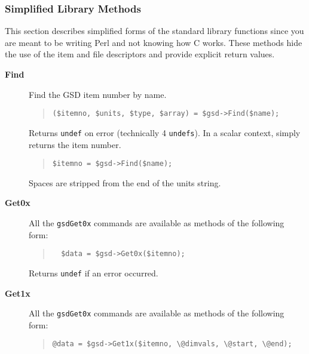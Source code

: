 \documentclass[twoside,11pt]{article}
\newenvironment{myquote}{\begin{quote}\begin{small}}{\end{small}\end{quote}}
\renewcommand{\_}{\texttt{\symbol{95}}}
\begin{document}
\subsubsection{Simplified Library Methods\label{Simplified_Library_Methods}}

This section describes simplified forms of the standard library
functions since you are meant to be writing Perl and not knowing
how C works. These methods hide the use of the item and file
descriptors and provide explicit return values.

\begin{description}
\item[\textbf{Find}] \mbox{}

Find the GSD item number by name.

\begin{myquote}
\begin{verbatim}
($itemno, $units, $type, $array) = $gsd->Find($name);
\end{verbatim}
\end{myquote} 

Returns \texttt{undef} on error (technically 4 \texttt{undefs}).
In a scalar context, simply returns the item number.

\begin{myquote}
\begin{verbatim}
$itemno = $gsd->Find($name);
\end{verbatim} 
\end{myquote} %

Spaces are stripped from the end of the units string.

\item[\textbf{Get0x}] \mbox{}

All the \texttt{gsdGet0x} commands are available as methods of the following
form:

\begin{myquote}
\begin{verbatim}
  $data = $gsd->Get0x($itemno);
\end{verbatim} 
\end{myquote} %

Returns \texttt{undef} if an error occurred.

\item[\textbf{Get1x}] \mbox{}
  
  All the \texttt{gsdGet0x} commands are available as methods of the following
  form:

\begin{myquote}
\begin{verbatim}
@data = $gsd->Get1x($itemno, \@dimvals, \@start, \@end);
\end{verbatim}
\end{myquote} %



\end{description}
\end{document}

